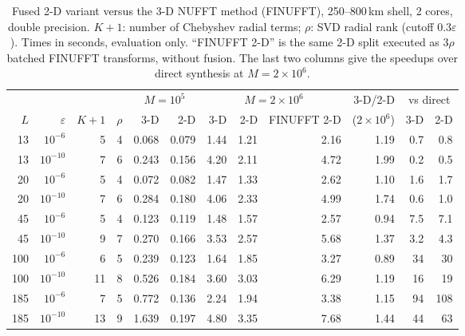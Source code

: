 \begin{table}[!htbp]\centering\footnotesize\setlength{\tabcolsep}{4pt}
\caption{Fused 2-D variant versus the 3-D NUFFT method (FINUFFT), 250--800\,km shell, 2 cores, double precision.
$K+1$: number of Chebyshev radial terms; $\rho$: SVD radial rank (cutoff $0.3\varepsilon$). Times in seconds, evaluation only.
``FINUFFT 2-D'' is the same 2-D split executed as $3\rho$ batched FINUFFT transforms, without fusion.
The last two columns give the speedups over direct synthesis at $M=2\times10^6$.}\label{tab:2d}
\begin{tabular}{rrrr rr rrr r rr}\toprule
&&&&\multicolumn{2}{c}{$M=10^5$}&\multicolumn{3}{c}{$M=2\times10^6$}&3-D/2-D&\multicolumn{2}{c}{vs direct}\\
\cmidrule(lr){5-6}\cmidrule(lr){7-9}\cmidrule(lr){11-12}
$L$&$\varepsilon$&$K{+}1$&$\rho$&3-D&2-D&3-D&2-D&FINUFFT 2-D&($2{\times}10^6$)&3-D&2-D\\\midrule
13 & $10^{-6}$ & 5 & 4 & 0.068 & 0.079 & 1.44 & 1.21 & 2.16 & 1.19 & 0.7 & 0.8\\
13 & $10^{-10}$ & 7 & 6 & 0.243 & 0.156 & 4.20 & 2.11 & 4.72 & 1.99 & 0.2 & 0.5\\
20 & $10^{-6}$ & 5 & 4 & 0.072 & 0.082 & 1.47 & 1.33 & 2.62 & 1.10 & 1.6 & 1.7\\
20 & $10^{-10}$ & 7 & 6 & 0.284 & 0.180 & 4.06 & 2.33 & 4.99 & 1.74 & 0.6 & 1.0\\
45 & $10^{-6}$ & 5 & 4 & 0.123 & 0.119 & 1.48 & 1.57 & 2.57 & 0.94 & 7.5 & 7.1\\
45 & $10^{-10}$ & 9 & 7 & 0.270 & 0.166 & 3.53 & 2.57 & 5.68 & 1.37 & 3.2 & 4.3\\
100 & $10^{-6}$ & 6 & 5 & 0.239 & 0.123 & 1.64 & 1.85 & 3.27 & 0.89 & 34 & 30\\
100 & $10^{-10}$ & 11 & 8 & 0.526 & 0.184 & 3.60 & 3.03 & 6.29 & 1.19 & 16 & 19\\
185 & $10^{-6}$ & 7 & 5 & 0.772 & 0.136 & 2.24 & 1.94 & 3.38 & 1.15 & 94 & 108\\
185 & $10^{-10}$ & 13 & 9 & 1.639 & 0.197 & 4.80 & 3.35 & 7.68 & 1.44 & 44 & 63\\
\bottomrule\end{tabular}\end{table}
